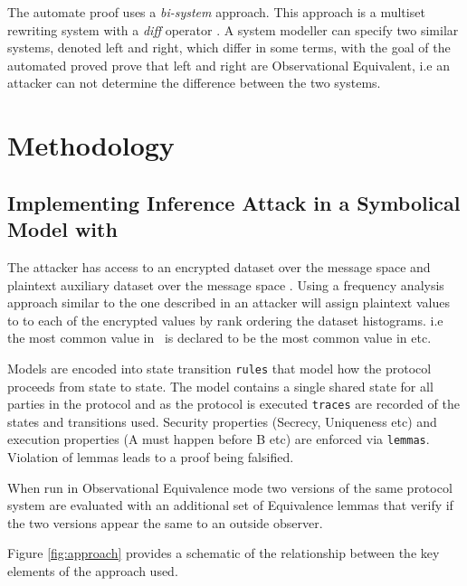 \documentclass[journal]{IEEEtran}
\begin{document}
The automate proof uses a \textit{bi-system} approach. This approach is a multiset rewriting system with a \textit{diff} operator \cite{AutomatedObsEqv18}.  A system modeller can specify two similar systems, denoted left and right, which differ in some terms, with the goal of the automated proved prove that left and right are Observational Equivalent, i.e an attacker can not determine the difference between the two systems.
\section{Methodology}
\subsection{Implementing Inference Attack in a Symbolical Model with \tamarin{}}
The attacker has access to an encrypted dataset \enc{} over the message space \encSpace{} and plaintext auxiliary dataset \aux{} over the message space \auxSpace. Using a frequency analysis approach similar to the one described in \cite{InfrenceAttacks} an attacker will assign plaintext values to to each of the encrypted values by rank ordering the dataset histograms. i.e the most common value in \enc{}\ is declared to be the most common value in \aux{} etc.

Models are encoded into state transition \texttt{rules} that model how the protocol proceeds from state to state. The model contains a single shared state for all parties in the protocol and as the protocol is executed \texttt{traces} are recorded of the states and transitions used. Security properties (Secrecy, Uniqueness etc) and execution properties (A must happen before B etc) are enforced via \texttt{lemmas}. Violation of lemmas leads to a proof being falsified.

When run in Observational Equivalence mode two versions of the same protocol system are evaluated with an additional set of Equivalence lemmas that verify if the two versions appear the same to an outside observer.

Figure \ref{fig:approach} provides a schematic of the relationship between the key elements of the approach used.
\end{document}
